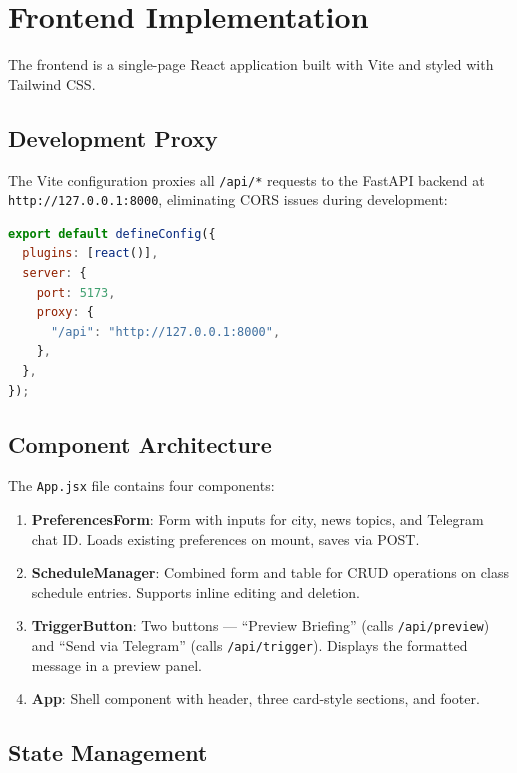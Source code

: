 \documentclass[12pt, a4paper]{article}
\begin{document}
\section{Frontend Implementation}

The frontend is a single-page React application built with Vite and styled with Tailwind CSS.

\subsection{Development Proxy}

The Vite configuration proxies all \texttt{/api/*} requests to the FastAPI backend at \texttt{http://127.0.0.1:8000}, eliminating CORS issues during development:

\begin{lstlisting}[language=JavaScript, title={vite.config.js}]
export default defineConfig({
  plugins: [react()],
  server: {
    port: 5173,
    proxy: {
      "/api": "http://127.0.0.1:8000",
    },
  },
});
\end{lstlisting}

\subsection{Component Architecture}

The \texttt{App.jsx} file contains four components:

\begin{enumerate}[leftmargin=2em]
  \item \textbf{PreferencesForm}: Form with inputs for city, news topics, and Telegram chat ID. Loads existing preferences on mount, saves via POST.
  \item \textbf{ScheduleManager}: Combined form and table for CRUD operations on class schedule entries. Supports inline editing and deletion.
  \item \textbf{TriggerButton}: Two buttons --- ``Preview Briefing'' (calls \texttt{/api/preview}) and ``Send via Telegram'' (calls \texttt{/api/trigger}). Displays the formatted message in a preview panel.
  \item \textbf{App}: Shell component with header, three card-style sections, and footer.
\end{enumerate}

\subsection{State Management}
\end{document}
